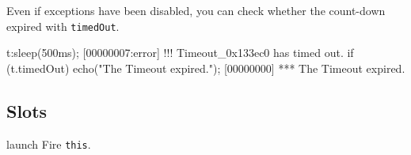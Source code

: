 Even if exceptions have been disabled, you can check whether the
count-down expired with \lstinline|timedOut|.

\begin{urbiscript}
t:sleep(500ms);
[00000007:error] !!! Timeout_0x133ec0 has timed out.
if (t.timedOut)
  echo("The Timeout expired.");
[00000000] *** The Timeout expired.
\end{urbiscript}

\subsection{Slots}
\begin{urbiscriptapi}
\item[launch]
  Fire \lstinline|this|.

\end{urbiscriptapi}

